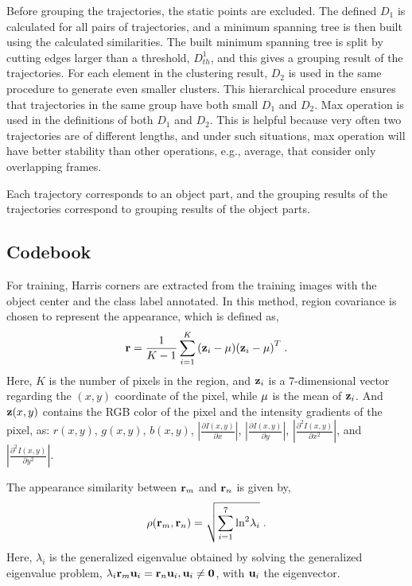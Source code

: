 Before grouping the trajectories, the static points are excluded.   The defined $D_1$ is calculated for all pairs of trajectories, and a minimum spanning tree is then built using the calculated similarities. The built minimum spanning tree is split by cutting edges larger than a threshold, $D^1_{th}$, and this gives a grouping result of the trajectories. For each element in the clustering result, $D_2$  is used in the same procedure to generate even smaller clusters. This hierarchical procedure ensures that trajectories in the same group have both small $D_1$ and $D_2$. Max operation is used in the definitions of both $D_1$ and $D_2$. This is helpful because very often two trajectories are of different
lengths, and under such situations, max operation will have better stability than other operations, e.g., average, that consider only overlapping frames.

Each trajectory corresponds to an object part, and the grouping results of the trajectories correspond to grouping results of the object parts.


\subsection{Codebook}

For training, Harris corners are extracted from the training images with the object center and the class label annotated. In this method, region covariance is chosen to represent the appearance, which is defined as,
\[{\bf{r}} = \frac{1}{{K - 1}}\sum\limits_{i = 1}^K {({{\bf{z}}_i} - {\bf{\mu }}){{({{\bf{z}}_i} - {\bf{\mu }})}^T}} \;.\]
Here, $K$ is the number of pixels in the region, and ${{\bf{z}}_i}$ is a $7$-dimensional vector regarding the $(x,y)$ coordinate of the pixel, while ${\bf{\mu }}$ is the mean of ${{\bf{z}}_i}$.   And ${{\bf{z}}}(x,y)$ contains the RGB color of the pixel and the intensity gradients of the pixel, as: $r(x,y)$, $g(x,y)$, $b(x,y)$, $|\frac {\partial I(x,y)} {\partial x}|$, $|\frac{\partial I(x,y)}{\partial y}|$, $|\frac{{\partial ^2}I(x,y)}{\partial {x^2}}|$, and $|\frac{{\partial ^2}I(x,y)}{\partial {y^2}}|$.

The appearance similarity between ${\bf{r}}_m$ and ${\bf{r}}_n$ is given by,
\[
\rho ({\bf{r}}_m,{\bf{r}}_n) = \sqrt {\sum\limits_{i = 1}^7 {{{\ln }^2}{\lambda _i}} }\;.
\]
Here, $\lambda _i$ is the generalized eigenvalue obtained by solving the generalized eigenvalue problem, ${\lambda _i}{\bf{r}}_m{{\bf{u}}_i} = {\bf{r}}_n {{\bf{u}}_i},{{\bf{u}}_i} \ne {\bf{0}}$, with ${\bf{u}}_i$ the eigenvector.

